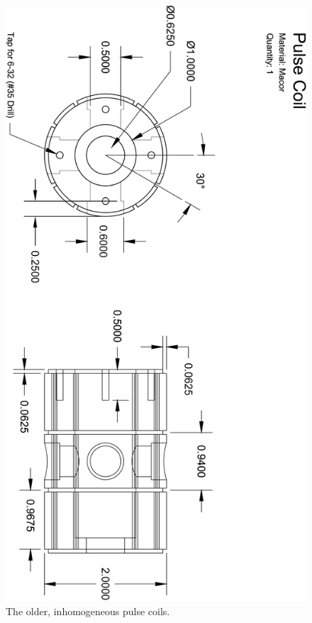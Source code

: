 \documentclass[../PaulGanssle-Thesis.tex]{subfiles}
\begin{document}
\begin{figure}[p]
\centering
\includegraphics[height=0.95\textheight]{appendices/blueprints/OldPulseCoils.png}
\caption{The older, inhomogeneous pulse coils.}
\label{blueprints:OldPulseCoils}
\end{figure}
\end{document}

